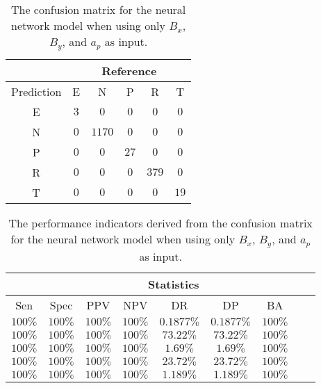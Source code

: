 \begin{table}[!ht]
	\centering
	\begin{tabular}{|c|c|c|c|c|c|}
		\hline
		 & \multicolumn{5}{|c|}{Reference} \\ \hline
		 Prediction & E & N & P & R & T \\ \hline
		 E & $3$ & $0$ & $0$ & $0$ & $0$ \\ \hline
		 N & $0$ & $1170$ & $0$ & $0$ & $0$ \\ \hline
		 P & $0$ & $0$ & $27$ & $0$ & $0$ \\ \hline
		 R & $0$ & $0$ & $0$ & $379$ & $0$ \\ \hline
		 T & $0$ & $0$ & $0$ & $0$ & $19$ \\ \hline
	\end{tabular}
	\caption{The confusion matrix for the neural network model when using only $B_{x}$, $B_{y}$, and $a_{p}$ as input.}
	\label{tab:cm:xyap:nnet}
\end{table}

\begin{table}[!ht]
	\centering
	\begin{tabular}{|c|c|c|c|c|c|c|c|c|}
		\hline
		 & \multicolumn{7}{c|}{Statistics} \\ \hline
		Sen & Spec & PPV & NPV & DR & DP & BA \\ \hline
		$100\%$ & $100\%$ & $100\%$ & $100\%$ & $0.1877\%$ & $0.1877\%$ & $100\%$ \\ \hline
		$100\%$ & $100\%$ & $100\%$ & $100\%$ & $73.22\%$ & $73.22\%$ & $100\%$ \\ \hline
		$100\%$ & $100\%$ & $100\%$ & $100\%$ & $1.69\%$ & $1.69\%$ & $100\%$ \\ \hline
		$100\%$ & $100\%$ & $100\%$ & $100\%$ & $23.72\%$ & $23.72\%$ & $100\%$ \\ \hline
		$100\%$ & $100\%$ & $100\%$ & $100\%$ & $1.189\%$ & $1.189\%$ & $100\%$ \\ \hline
	\end{tabular}
	\caption{The performance indicators derived from the confusion matrix for the neural network model when using only $B_{x}$, $B_{y}$, and $a_{p}$ as input.}
	\label{tab:cs:xyap:nnet}
\end{table}
